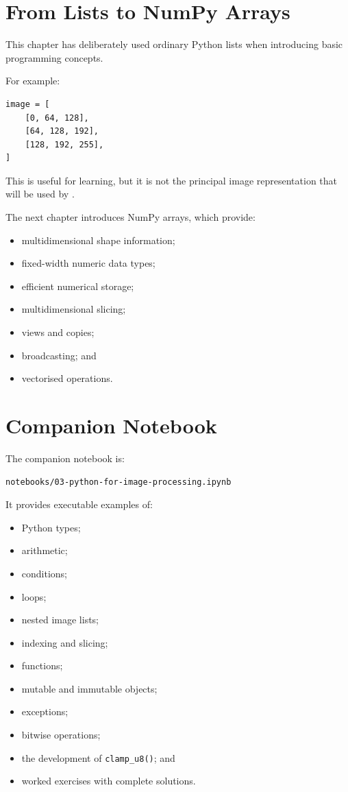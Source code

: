 \section{From Lists to NumPy Arrays}
\label{sec:lists-to-numpy}

This chapter has deliberately used ordinary Python lists when
introducing basic programming concepts.

For example:

\begin{verbatim}
image = [
    [0, 64, 128],
    [64, 128, 192],
    [128, 192, 255],
]
\end{verbatim}

This is useful for learning, but it is not the principal image
representation that will be used by \pyimage{}.

The next chapter introduces NumPy arrays, which provide:

\begin{itemize}
    \item multidimensional shape information;
    \item fixed-width numeric data types;
    \item efficient numerical storage;
    \item multidimensional slicing;
    \item views and copies;
    \item broadcasting; and
    \item vectorised operations.
\end{itemize}


\section{Companion Notebook}
\label{sec:ch03-notebook}

The companion notebook is:

\begin{verbatim}
notebooks/03-python-for-image-processing.ipynb
\end{verbatim}

It provides executable examples of:

\begin{itemize}
    \item Python types;
    \item arithmetic;
    \item conditions;
    \item loops;
    \item nested image lists;
    \item indexing and slicing;
    \item functions;
    \item mutable and immutable objects;
    \item exceptions;
    \item bitwise operations;
    \item the development of \texttt{clamp\_u8()}; and
    \item worked exercises with complete solutions.
\end{itemize}


